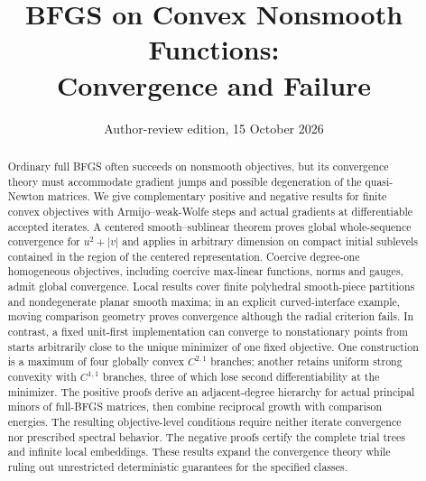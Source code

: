 \documentclass[smallextended]{svjour3}
\title{BFGS on Convex Nonsmooth Functions:\\Convergence and Failure}
\author{}
\institute{}
\date{Author-review edition, 15 October 2026}
\begin{document}
\begingroup
\renewcommand{\footnotetext}[2][]{}
\maketitle
\endgroup
\begin{abstract}
Ordinary full BFGS often succeeds on nonsmooth objectives, but its convergence
theory must accommodate gradient jumps and possible degeneration of the
quasi-Newton matrices. We give complementary positive and negative results
for finite convex objectives with Armijo--weak-Wolfe steps and actual gradients
at differentiable accepted iterates. A centered smooth--sublinear theorem
proves global whole-sequence convergence for $u^2+|v|$ and applies in arbitrary
dimension on compact initial sublevels contained in the region of the centered
representation. Coercive degree-one homogeneous
objectives, including coercive max-linear functions, norms and gauges, admit global
convergence. Local results cover finite polyhedral smooth-piece partitions
and nondegenerate planar smooth maxima; in an explicit curved-interface
example, moving comparison geometry proves convergence although the radial
criterion fails. In contrast,
a fixed unit-first implementation can converge to nonstationary points from
starts arbitrarily close to the unique minimizer of one fixed objective. One
construction is a maximum of four globally convex $C^{2,1}$ branches; another
retains uniform strong convexity with $C^{1,1}$ branches, three of which lose
second differentiability at the minimizer. The positive proofs derive an
adjacent-degree hierarchy for actual principal minors of full-BFGS matrices,
then combine reciprocal growth with comparison energies. The resulting
objective-level conditions require neither iterate convergence nor prescribed
spectral behavior. The negative proofs certify the complete trial trees and
infinite local embeddings. These results expand the convergence theory while
ruling out unrestricted deterministic guarantees for the specified classes.
\end{abstract}







\appendix
\normalsize






\end{document}
